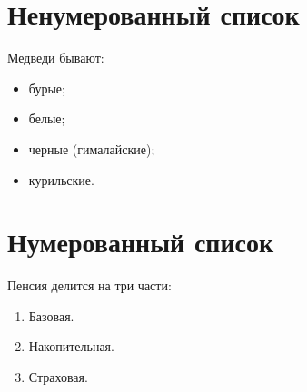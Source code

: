 \documentclass[a4paper, 12pt]{article}
\begin{document}
\section{Ненумерованный список}
Медведи бывают:
\begin{itemize}
  \item бурые;
  \item белые;
  \item черные (гималайские);
  \item курильские.
\end{itemize}

\section{Нумерованный список}
Пенсия делится на три части:
\begin{enumerate}
  \item Базовая.
  \item Накопительная.
  \item Страховая.
\end{enumerate}
\end{document}
